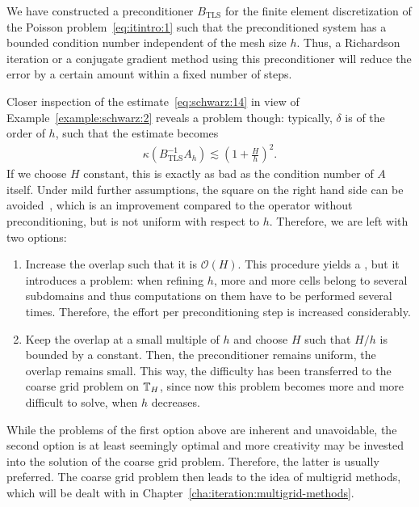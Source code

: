 \begin{remark}
  We have constructed a preconditioner $B_{\text{TLS}}$ for the finite
  element discretization of the Poisson problem~\eqref{eq:itintro:1}
  such that the preconditioned system has a bounded condition number
  independent of the mesh size $h$. Thus, a Richardson iteration or a
  conjugate gradient method using this preconditioner will reduce the
  error by a certain amount within a fixed number of steps.
  
  Closer inspection of the estimate~\eqref{eq:schwarz:14} in view of
  Example~\ref{example:schwarz:2} reveals a problem though: typically,
  $\delta$ is of the order of $h$, such that the estimate becomes
  \begin{gather*}
    \kappa(B^{-1}_{\text{TLS}} A_h) \lesssim \left(1+\frac H h\right)^2.
  \end{gather*}
  If we choose $H$ constant, this is exactly as bad as the condition
  number of $A$ itself. Under mild further assumptions, the square on
  the right hand side can be avoided~\cite{DryjaWidlund94}, which
  is an improvement compared to the operator without preconditioning,
  but is not uniform with respect to $h$. Therefore, we are left with
  two options:
  \begin{enumerate}
  \item Increase the overlap such that it is $\mathcal O(H)$. This
    procedure yields a , but it
    introduces a problem: when refining $h$, more and more
    cells belong to several subdomains and thus computations on them
    have to be performed several times. Therefore, the effort per
    preconditioning step is increased considerably.
  \item Keep the overlap at a small multiple of $h$ and choose $H$
    such that $H/h$ is bounded by a constant. Then, the preconditioner
    remains uniform, the overlap remains small. This way, the
    difficulty has been transferred to the coarse grid problem on
    $\mathbb T_H$, since now this problem becomes more and more difficult to
    solve, when $h$ decreases.
  \end{enumerate}
  
  While the problems of the first option above are inherent and
  unavoidable, the second option is at least seemingly optimal and
  more creativity may be invested into the solution of the coarse grid
  problem. Therefore, the latter is usually preferred. The coarse grid
  problem then leads to the idea of multigrid methods, which will be
  dealt with in Chapter~\ref{cha:iteration:multigrid-methods}.
\end{remark}

